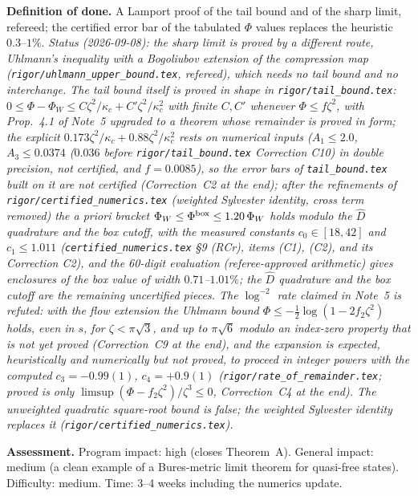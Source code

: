 \documentclass[11pt]{article}
\theoremstyle{accent}
\theoremstyle{definition}
\begin{document}
\textbf{Definition of done.} A Lamport proof of the tail bound and of the sharp limit, refereed; the certified error bar of the tabulated \(\Phi\) values replaces the heuristic \(0.3\)--\(1\%\).  \emph{Status (2026-09-08): the sharp limit is proved by a different route, Uhlmann's inequality with a Bogoliubov extension of the compression map (\texttt{rigor/uhlmann\_upper\_bound.tex}, refereed), which needs no tail bound and no interchange.  The tail bound itself is proved in shape in \texttt{rigor/tail\_bound.tex}: \(0\le\Phi-\Phi_W\le C\zeta^2/\kappa_c+C'\zeta^2/\kappa_c^2\) with finite \(C,C'\) whenever \(\Phi\le f\zeta^2\), with Prop.~4.1 of Note~5 upgraded to a theorem whose remainder is proved in form; the explicit \(0.173\zeta^2/\kappa_c+0.88\zeta^2/\kappa_c^2\) rests on numerical inputs (\(A_1\le2.0\), \(A_3\le0.0374\) (\(0.036\) before \texttt{rigor/tail\_bound.tex} Correction C10) in double precision, not certified, and \(f=0.0085\)), so the error bars of \texttt{tail\_bound.tex} built on it are not certified (Correction~C2 at the end); after the refinements of \texttt{rigor/certified\_numerics.tex} (weighted Sylvester identity, cross term removed) the a priori bracket \(\Phi_W\le\Phi^{\rm box}\le1.20\,\Phi_W\) holds modulo the \(\widehat D\) quadrature and the box cutoff, with the measured constants \(c_0\in[18,42]\) and \(c_1\le1.011\) (\texttt{certified\_numerics.tex} \S9 (RCr), items (C1), (C2), and its Correction C2), and the 60-digit evaluation (referee-approved arithmetic) gives enclosures of the box value of width \(0.71\)--\(1.01\%\); the \(\widehat D\) quadrature and the box cutoff are the remaining uncertified pieces.  The \(\log^{-2}\) rate claimed in Note~5 is refuted: with the flow extension the Uhlmann bound \(\Phi\le-\frac12\log(1-2f_2\zeta^2)\) holds, even in \(s\), for \(\zeta<\pi\sqrt3\), and up to \(\pi\sqrt6\) modulo an index-zero property that is not yet proved (Correction~C9 at the end), and the expansion is expected, heuristically and numerically but not proved, to proceed in integer powers with the computed \(c_3=-0.99(1)\), \(c_4=+0.9(1)\) (\texttt{rigor/rate\_of\_remainder.tex}; proved is only \(\limsup(\Phi-f_2\zeta^2)/\zeta^3\le0\), Correction~C4 at the end).  The unweighted quadratic square-root bound is false; the weighted Sylvester identity replaces it (\texttt{rigor/certified\_numerics.tex}).}

\textbf{Assessment.} Program impact: high (closes Theorem~A).  General impact: medium (a clean example of a Bures-metric limit theorem for quasi-free states).  Difficulty: medium.  Time: 3--4 weeks including the numerics update.
\end{document}
